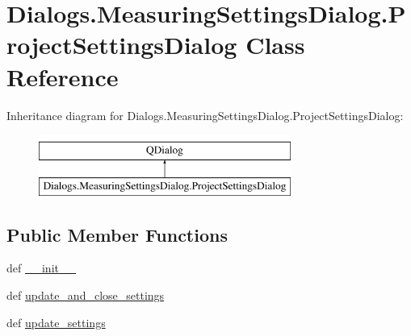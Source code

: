 \hypertarget{classDialogs_1_1MeasuringSettingsDialog_1_1ProjectSettingsDialog}{\section{Dialogs.\-Measuring\-Settings\-Dialog.\-Project\-Settings\-Dialog Class Reference}
\label{classDialogs_1_1MeasuringSettingsDialog_1_1ProjectSettingsDialog}
}
Inheritance diagram for Dialogs.\-Measuring\-Settings\-Dialog.\-Project\-Settings\-Dialog\-:\begin{figure}[H]
\begin{center}
\leavevmode
\includegraphics[height=2.000000cm]{classDialogs_1_1MeasuringSettingsDialog_1_1ProjectSettingsDialog}
\end{center}
\end{figure}
\subsection*{Public Member Functions}
\begin{DoxyCompactItemize}
\item 
def \hyperlink{classDialogs_1_1MeasuringSettingsDialog_1_1ProjectSettingsDialog_a603358993a934fdaed3867f9ad43d72f}{\-\_\-\-\_\-init\-\_\-\-\_\-}
\item 
def \hyperlink{classDialogs_1_1MeasuringSettingsDialog_1_1ProjectSettingsDialog_ad5036f7a5b08f5d6024e4d9ba8a027b3}{update\-\_\-and\-\_\-close\-\_\-settings}
\item 
def \hyperlink{classDialogs_1_1MeasuringSettingsDialog_1_1ProjectSettingsDialog_af076d02f49cd614ab600cdc6d0b73289}{update\-\_\-settings}
\end{DoxyCompactItemize}
